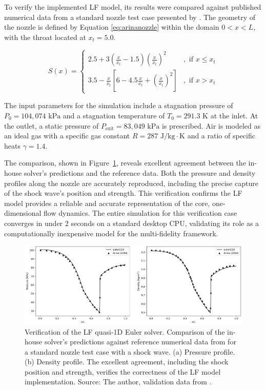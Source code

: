 \documentclass[tg, EN]{ufabcFHZh_tg}
\begin{document}
To verify the implemented LF model, its results were compared against published numerical data from a standard nozzle test case presented by \cite{arina2004}. The geometry of the nozzle is defined by Equation \ref{eq:arinanozzle} within the domain $0 < x < L$, with the throat located at $x_t = 5.0$.

\begin{equation}
S(x)= \begin{cases}
2.5+3\left(\frac{x}{x_t}-1.5\right)\left(\frac{x}{x_t}\right)^2 & , \text { if } x \leqslant x_t \\
3.5-\frac{x}{x_t}\left[6-4.5 \frac{x}{x_t}+\left(\frac{x}{x_t}\right)^2\right] & , \text { if } x>x_t
\end{cases}
\label{eq:arinanozzle}
\end{equation}

The input parameters for the simulation include a stagnation pressure of $P_0 = 104,074 \text{ kPa}$ and a stagnation temperature of $T_0 = 291.3 \text{ K}$ at the inlet. At the outlet, a static pressure of $P_{\text{exit}} = 83,049 \text{ kPa}$ is prescribed. Air is modeled as an ideal gas with a specific gas constant $R = 287 \text{ J/kg}\cdot\text{K}$ and a ratio of specific heats $\gamma = 1.4$.

The comparison, shown in Figure~\ref{fig:lf_verification}, reveals excellent agreement between the in-house solver's predictions and the reference data. Both the pressure and density profiles along the nozzle are accurately reproduced, including the precise capture of the shock wave's position and strength. This verification confirms the LF model provides a reliable and accurate representation of the core, one-dimensional flow dynamics. The entire simulation for this verification case converges in under 2 seconds on a standard desktop CPU, validating its role as a computationally inexpensive model for the multi-fidelity framework.

\begin{figure}[H]
    \centering
    \includegraphics[width=\textwidth]{Figuras/arina_validation.png}
    \caption{Verification of the LF quasi-1D Euler solver. Comparison of the in-house solver's predictions against reference numerical data from \cite{arina2004} for a standard nozzle test case with a shock wave. (a) Pressure profile. (b) Density profile. The excellent agreement, including the shock position and strength, verifies the correctness of the LF model implementation. Source: The author, validation data from \cite{arina2004}.}
    \label{fig:lf_verification}
\end{figure}
\end{document}
